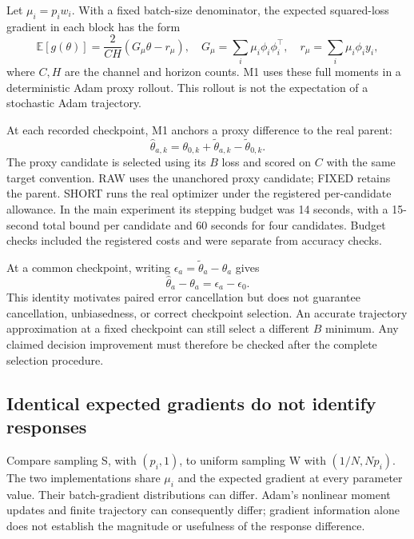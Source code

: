 \documentclass[11pt]{article}
\newcommand{\E}{\mathbb{E}}
\begin{document}
Let $\mu_i=p_iw_i$. With a fixed batch-size denominator, the expected squared-loss gradient in each block has the form
\begin{equation}
 \E[g(\theta)]=\frac{2}{CH}(G_\mu\theta-r_\mu),\quad
 G_\mu=\sum_i\mu_i\phi_i\phi_i^\top,\quad
 r_\mu=\sum_i\mu_i\phi_i y_i,
\end{equation}
where $C,H$ are the channel and horizon counts. M1 uses these full moments in a deterministic Adam proxy rollout. This rollout is not the expectation of a stochastic Adam trajectory.

At each recorded checkpoint, M1 anchors a proxy difference to the real parent:
\begin{equation}
 \widehat\theta_{a,k}=\theta_{0,k}
       +\widetilde\theta_{a,k}-\widetilde\theta_{0,k}.
\end{equation}
The proxy candidate is selected using its $B$ loss and scored on $C$ with the same target convention. RAW uses the unanchored proxy candidate; FIXED retains the parent. SHORT runs the real optimizer under the registered per-candidate allowance. In the main experiment its stepping budget was 14 seconds, with a 15-second total bound per candidate and 60 seconds for four candidates. Budget checks included the registered costs and were separate from accuracy checks.

At a common checkpoint, writing $\epsilon_a=\widetilde\theta_a-\theta_a$ gives
\begin{equation}
 \widehat\theta_a-\theta_a=\epsilon_a-\epsilon_0.
\end{equation}
This identity motivates paired error cancellation but does not guarantee cancellation, unbiasedness, or correct checkpoint selection. An accurate trajectory approximation at a fixed checkpoint can still select a different $B$ minimum. Any claimed decision improvement must therefore be checked after the complete selection procedure.

\subsection{Identical expected gradients do not identify responses}
Compare sampling S, with $(p_i,1)$, to uniform sampling W with $(1/N,Np_i)$. The two implementations share $\mu_i$ and the expected gradient at every parameter value. Their batch-gradient distributions can differ. Adam's nonlinear moment updates and finite trajectory can consequently differ; gradient information alone does not establish the magnitude or usefulness of the response difference.
\end{document}
